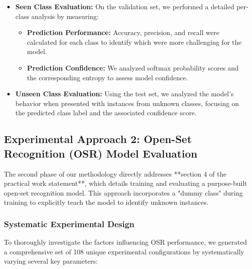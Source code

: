 \documentclass[11pt, a4paper]{article}
\begin{document}
\begin{itemize}
    \item \textbf{Seen Class Evaluation:} On the validation set, we performed a detailed per-class analysis by measuring:
    \begin{itemize}
        \item \textbf{Prediction Performance:} Accuracy, precision, and recall were calculated for each class to identify which were more challenging for the model.
        \item \textbf{Prediction Confidence:} We analyzed softmax probability scores and the corresponding entropy to assess model confidence.
    \end{itemize}
    \item \textbf{Unseen Class Evaluation:} Using the test set, we analyzed the model's behavior when presented with instances from unknown classes, focusing on the predicted class label and the associated confidence score.
\end{itemize}

\subsection{Experimental Approach 2: Open-Set Recognition (OSR) Model Evaluation}

The second phase of our methodology directly addresses **section 4 of the practical work statement**, which details training and evaluating a purpose-built open-set recognition model. This approach incorporates a "dummy class" during training to explicitly teach the model to identify unknown instances.

\subsubsection{Systematic Experimental Design}
To thoroughly investigate the factors influencing OSR performance, we generated a comprehensive set of 108 unique experimental configurations by systematically varying several key parameters:
\end{document}
